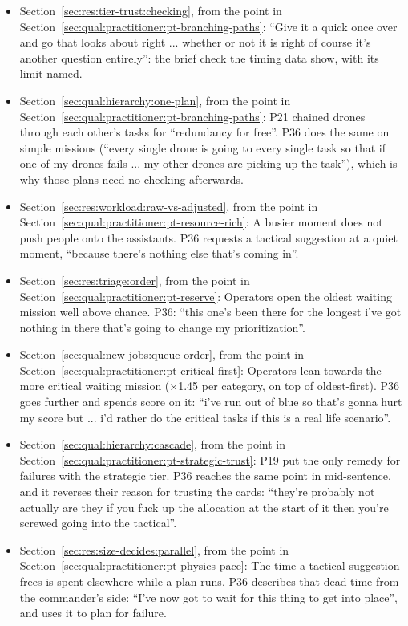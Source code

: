 \begin{itemize}[leftmargin=1.2em,itemsep=1pt]
\item Section~\ref{sec:res:tier-trust:checking}, from the point in Section~\ref{sec:qual:practitioner:pt-branching-paths}: ``Give it a quick once over and go that looks about right ... whether or not it is right of course it's another question entirely'': the brief check the timing data show, with its limit named.
\item Section~\ref{sec:qual:hierarchy:one-plan}, from the point in Section~\ref{sec:qual:practitioner:pt-branching-paths}: P21 chained drones through each other's tasks for ``redundancy for free''. P36 does the same on simple missions (``every single drone is going to every single task so that if one of my drones fails ... my other drones are picking up the task''), which is why those plans need no checking afterwards.
\item Section~\ref{sec:res:workload:raw-vs-adjusted}, from the point in Section~\ref{sec:qual:practitioner:pt-resource-rich}: A busier moment does not push people onto the assistants. P36 requests a tactical suggestion at a quiet moment, ``because there's nothing else that's coming in''.
\item Section~\ref{sec:res:triage:order}, from the point in Section~\ref{sec:qual:practitioner:pt-reserve}: Operators open the oldest waiting mission well above chance. P36: ``this one's been there for the longest i've got nothing in there that's going to change my prioritization''.
\item Section~\ref{sec:qual:new-jobs:queue-order}, from the point in Section~\ref{sec:qual:practitioner:pt-critical-first}: Operators lean towards the more critical waiting mission ($\times$1.45 per category, on top of oldest-first). P36 goes further and spends score on it: ``i've run out of blue so that's gonna hurt my score but ... i'd rather do the critical tasks if this is a real life scenario''.
\item Section~\ref{sec:qual:hierarchy:cascade}, from the point in Section~\ref{sec:qual:practitioner:pt-strategic-trust}: P19 put the only remedy for failures with the strategic tier. P36 reaches the same point in mid-sentence, and it reverses their reason for trusting the cards: ``they're probably not actually are they if you fuck up the allocation at the start of it then you're screwed going into the tactical''.
\item Section~\ref{sec:res:size-decides:parallel}, from the point in Section~\ref{sec:qual:practitioner:pt-physics-pace}: The time a tactical suggestion frees is spent elsewhere while a plan runs. P36 describes that dead time from the commander's side: ``I've now got to wait for this thing to get into place'', and uses it to plan for failure.

\end{itemize}
